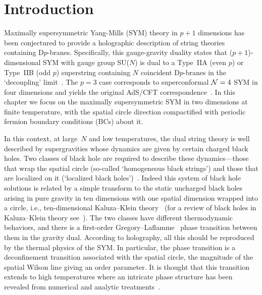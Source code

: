\section{Introduction}
Maximally supersymmetric Yang-Mills (SYM) theory in $p + 1$ dimensions has been conjectured to provide a holographic description of string theories containing D$p$-branes.
Specifically, this gauge-gravity duality states that ($p + 1$)-dimensional SYM with gauge group SU($N$) is dual to a Type~IIA (even $p$) or Type~IIB (odd $p$) superstring containing $N$ coincident D$p$-branes in the `decoupling' limit~\cite{Itzhaki:1998dd, Aharony:1999ti}.
The $p = 3$ case corresponds to superconformal $\mathcal N = 4$ SYM in four dimensions and yields the original AdS/CFT correspondence~\cite{Maldacena:1997re}.
In this chapter we focus on the maximally supersymmetric SYM in two dimensions at finite temperature, with the spatial circle direction compactified with periodic fermion boundary conditions (BCs) about it.

In this context, at large~$N$ and low temperatures, the dual string theory is well described by supergravities whose dynamics are given by certain charged black holes.
Two classes of black hole are required to describe these dynamics---those that wrap the spatial circle (so-called `homogeneous black strings') and those that are localized on it (`localized black holes')~\cite{Susskind:1997dr, Barbon:1998cr, Li:1998jy, Martinec:1998ja, Aharony:2004ig, Aharony:2005ew}.
Indeed this system of black hole solutions is related by a simple transform to the static uncharged black holes arising in pure gravity in ten dimensions with one spatial dimension wrapped into a circle, i.e., ten-dimensional Kaluza--Klein theory~\cite{Aharony:2004ig, Harmark:2004ws} (for a review of black holes in Kaluza--Klein theory see~\cite{Horowitz:2011cq}).
The two classes have different thermodynamic behaviors, and there is a first-order Gregory--Laflamme~\cite{Gregory:1993vy} phase transition between them in the gravity dual.
According to holography, all this should be reproduced by the thermal physics of the SYM.
In particular, the phase transition is a deconfinement transition associated with the spatial circle, the magnitude of the spatial Wilson line giving an order parameter.
It is thought that this transition extends to high temperatures where an intricate phase structure has been revealed from numerical and analytic treatments~\cite{Aharony:2004ig, Kawahara:2007fn, Mandal:2009vz}.

